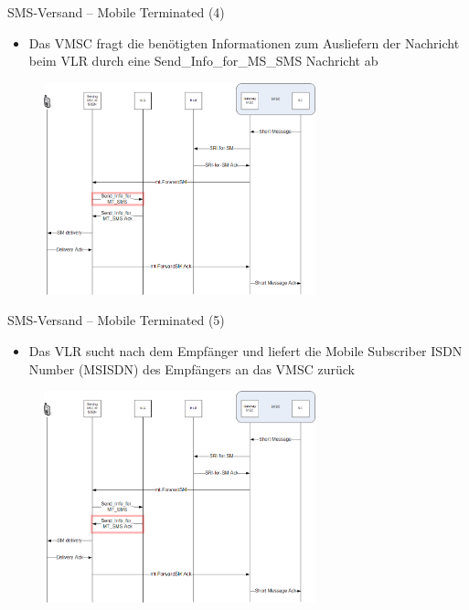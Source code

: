 \documentclass{beamer}
\begin{document}
\begin{frame}{SMS-Versand -- Mobile Terminated (4)}

	\begin{itemize}
		\item Das VMSC fragt die benötigten Informationen zum Ausliefern der Nachricht beim VLR 
			durch eine Send\_Info\_for\_MS\_SMS Nachricht ab
	\end{itemize}
	\begin{figure}[htm]
		\includegraphics[width=0.7\textwidth]{img/mt-forward-sm-4.png}
	\end{figure}
\end{frame}

\begin{frame}{SMS-Versand -- Mobile Terminated (5)}

	\begin{itemize}
		\item Das VLR sucht nach dem 
			Empfänger und liefert die Mobile Subscriber ISDN Number (MSISDN) des Empfängers an 
			das VMSC zurück
	\end{itemize}
	\begin{figure}[htm]
		\includegraphics[width=0.7\textwidth]{img/mt-forward-sm-5.png}
	\end{figure}
\end{frame}
\end{document}

